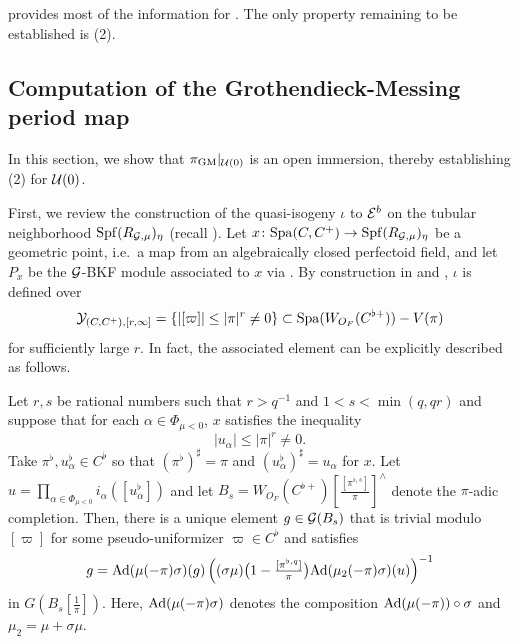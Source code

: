 \documentclass[12pt,reqno]{amsart}
\begin{document}
 provides most of the information for . The only property remaining to be established is  (2). 

\subsection{Computation of the Grothendieck-Messing period map}

In this section, we show that $\pi_{\operatorname{GM}}\vert_{{\mathcal{U}}(0)}$ is an open immersion, thereby establishing  (2) for ${\mathcal{U}}(0)$. 

First, we review the construction of the quasi-isogeny $\iota$ to ${\mathcal{E}}^b$ on the tubular neighborhood ${\operatorname{Spf}}(R_{{\mathcal{G}}, \mu})_\eta$ (recall ). Let $x \colon {\operatorname{Spa}}(C, C^+) \to {\operatorname{Spf}}(R_{{\mathcal{G}}, \mu})_\eta$ be a geometric point, i.e.\ a map from an algebraically closed perfectoid field, and let $P_x$ be the ${\mathcal{G}}$-BKF module associated to $x$ via . By construction in \cite[Proposition 5.2.6]{Ito25a} and \cite[Lemma 2.24]{Gle26_local_Shimura}, $\iota$ is defined over
\[
    {\mathcal{Y}}_{(C, C^+), [r, \infty]} = \{ \lvert [\varpi] \rvert \leq \lvert \pi \rvert^r \neq 0 \} \subset {\operatorname{Spa}}(W_{O_F}(C^{\flat +})) - V(\pi)
\]
for sufficiently large $r$. In fact, the associated element can be explicitly described as follows. 

\begin{lem} \label{lem:quasi_isog_computation}
    Let $r, s$ be rational numbers such that $r > q^{-1}$ and $1 < s < \min(q, qr)$ and suppose that for each $\alpha \in \Phi_{\mu < 0}$, $x$ satisfies the inequality
    \[
        \lvert u_\alpha \rvert \leq \lvert \pi \rvert^r \neq 0. 
    \]
    Take $\pi^\flat, u_\alpha^\flat \in C^\flat$ so that $(\pi^\flat)^\sharp = \pi$ and $(u_\alpha^\flat)^\sharp=u_\alpha$ for $x$. Let $u = \prod_{\alpha \in \Phi_{\mu < 0}} i_\alpha([u_\alpha^\flat])$ and let $B_s = W_{O_F}(C^{\flat +})[\tfrac{[\pi^{\flat, s}]}{\pi}]^\wedge$ denote the $\pi$-adic completion. Then, there is a unique element $g \in {\mathcal{G}}(B_s)$ that is trivial modulo $[\varpi]$ for some pseudo-uniformizer $\varpi \in C^\flat$ and satisfies
    \begin{equation} \label{eq:g_condition}
        g = {\operatorname{Ad}}(\mu(-\pi)\sigma)(g) \left((\sigma\mu)\bigl(1 - \tfrac{[\pi^{\flat, q}]}{\pi}\bigr) {\operatorname{Ad}}(\mu_2(-\pi)\sigma)(u) \right)^{-1}
    \end{equation}
    in $G(B_s[\tfrac{1}{\pi}])$. Here, ${\operatorname{Ad}}(\mu(-\pi)\sigma)$ denotes the composition ${\operatorname{Ad}}(\mu(-\pi)) \circ \sigma$ and $\mu_2 = \mu + \sigma\mu$. 
\end{lem}
\end{document}
